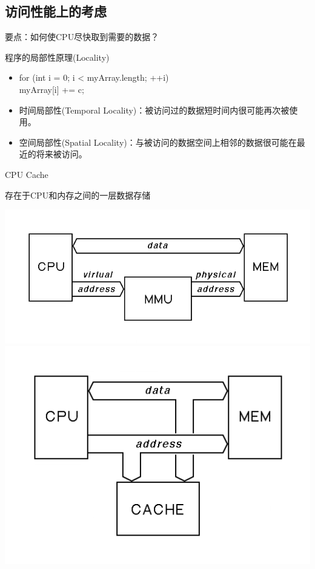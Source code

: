\documentclass[handout]{beamer}
\begin{document}
\begin{CJK}{UTF8}{gbsn}
\subsection{访问性能上的考虑}

\begin{frame}{要点：如何使CPU尽快取到需要的数据？}
  \begin{block}{程序的局部性原理(Locality)}
    \begin{itemize}
      \item {
          for (int i = 0; i < myArray.length; ++i) { \\
            myArray[i] += c; \\
          }
          \pause
      }
      \item {
          时间局部性(Temporal Locality)：被访问过的数据短时间内很可能再次被使用。
      }
      \item {
          空间局部性(Spatial Locality)：与被访问的数据空间上相邻的数据很可能在最近的将来被访问。
      }
    \end{itemize}
  \end{block}
\end{frame}

\begin{frame}{CPU Cache}
  \begin{block}{存在于CPU和内存之间的一层数据存储}
    \begin{center}
      \includegraphics[scale=0.2]{./images/cpu-mmu}
      \pause
      \includegraphics[scale=0.2]{./images/cpu-cache-memory}
    \end{center}
  \end{block}
\end{frame}


\end{CJK}
\end{document}
